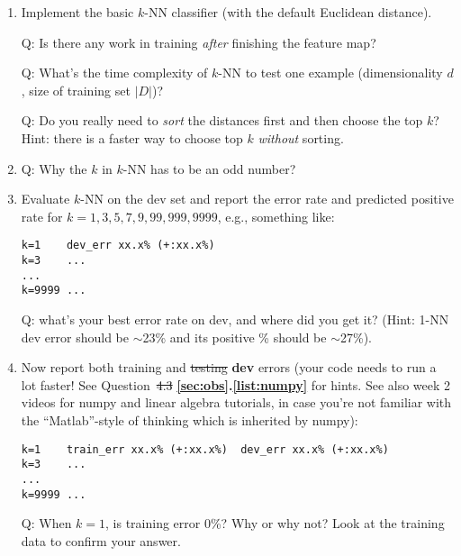 \documentclass[11pt]{article}
\newcommand{\update}[1]{{\bf\color{black} #1}}
\begin{document}
\begin{enumerate}

\item Implement the basic $k$-NN classifier (with the default Euclidean distance).

 
 Q: Is there any work in training {\em after} finishing the feature map?

  Q: What's the time complexity of $k$-NN to test one example (dimensionality $d$, size of training set $|D|$)?
  
  Q:  Do you really need to {\em sort} the distances  first and then choose the top $k$? Hint: there is a faster way to choose top $k$ {\em without} sorting.

\item
  Q: Why the $k$ in $k$-NN has to be an odd number?
  
\item
Evaluate $k$-NN on the dev set and report the error rate and predicted positive rate for $k=1,3,5,7,9,99,999,9999$, e.g., something like:

\begin{verbatim}
k=1    dev_err xx.x% (+:xx.x%) 
k=3    ...
...
k=9999 ...
\end{verbatim}

Q: what's your best error rate on dev, and where did you get it? 
(Hint: 1-NN dev error should be $\sim$23\% and its positive \% should be $\sim$27\%).

\item
  Now report both training and \sout{testing} \update{dev} errors (your code needs to run a lot faster!
  See Question~\sout{4.3} \update{\ref{sec:obs}.\ref{list:numpy}} for hints. See also week 2 videos for numpy and linear algebra tutorials, in case you're not familiar with the ``Matlab''-style of thinking which is inherited by numpy):
  
\begin{verbatim}
k=1    train_err xx.x% (+:xx.x%)  dev_err xx.x% (+:xx.x%) 
k=3    ...
...
k=9999 ...
\end{verbatim}

Q: When $k=1$, is training error 0\%? Why or why not? Look at the training data to confirm your answer.



\end{enumerate}
\end{document}
